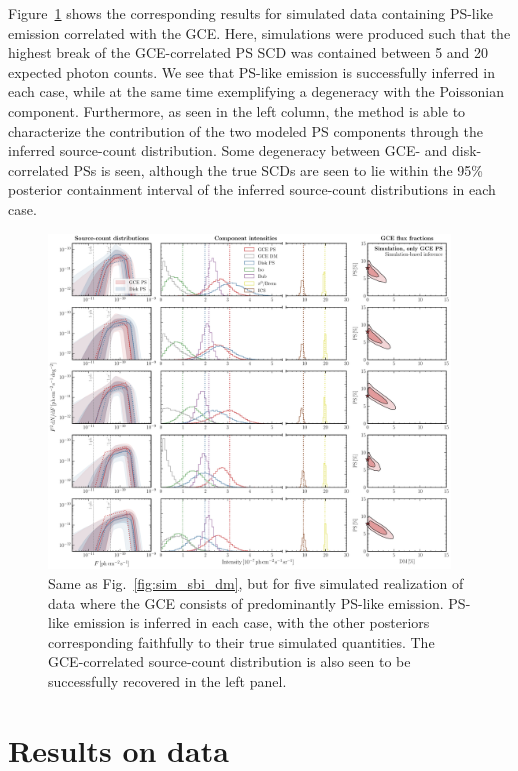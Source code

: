 \documentclass[prd,aps,10pt,nofootinbib,twocolumn,superscriptaddress,preprintnumbers,balancelastpage,longbibliography]{revtex4-1}
\begin{document}
Figure~\ref{fig:sim_sbi_ps} shows the corresponding results for simulated data containing PS-like emission correlated with the GCE. Here, simulations were produced such that the highest break of the GCE-correlated PS SCD was contained between 5 and 20 expected photon counts. We see that PS-like emission is successfully inferred in each case, while at the same time exemplifying a degeneracy with the Poissonian component. Furthermore, as seen in the left column, the method is able to characterize the contribution of the two modeled PS components through the inferred source-count distribution. Some degeneracy between GCE- and disk-correlated PSs is seen, although the true SCDs are seen to lie within the 95\% posterior containment interval of the inferred source-count distributions in each case.

%
\begin{figure}
\centering
\includegraphics[width=0.95\textwidth]{plots/sim_sbi_ps.pdf}
\caption{Same as Fig.~\ref{fig:sim_sbi_dm}, but for five simulated realization of \Fermi data where the GCE consists of predominantly PS-like emission. PS-like emission is inferred in each case, with the other posteriors corresponding faithfully to their true simulated quantities. The GCE-correlated source-count distribution is also seen to be successfully recovered in the left panel.}
\label{fig:sim_sbi_ps}
\end{figure}
%

\section{Results on \Fermi data}
\label{sec:data}
\end{document}
